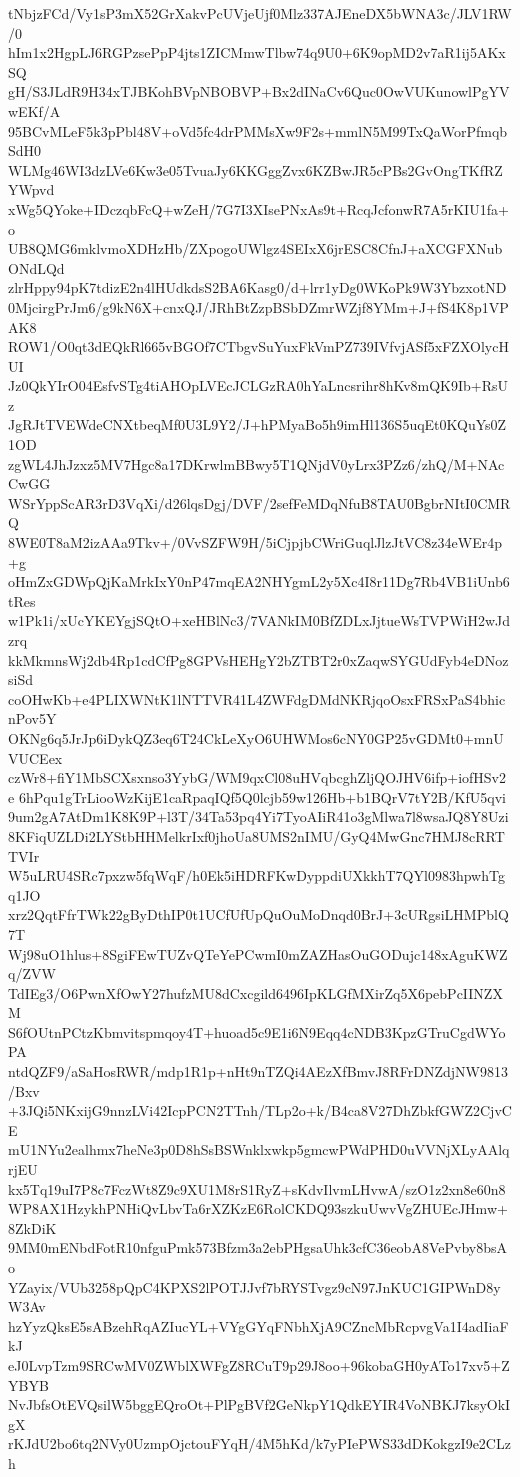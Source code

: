 tNbjzFCd/Vy1sP3mX52GrXakvPcUVjeUjf0Mlz337AJEneDX5bWNA3c/JLV1RW/0
hIm1x2HgpLJ6RGPzsePpP4jts1ZICMmwTlbw74q9U0+6K9opMD2v7aR1ij5AKxSQ
gH/S3JLdR9H34xTJBKohBVpNBOBVP+Bx2dINaCv6Quc0OwVUKunowlPgYVwEKf/A
95BCvMLeF5k3pPbl48V+oVd5fc4drPMMsXw9F2s+mmlN5M99TxQaWorPfmqbSdH0
WLMg46WI3dzLVe6Kw3e05TvuaJy6KKGggZvx6KZBwJR5cPBs2GvOngTKfRZYWpvd
xWg5QYoke+IDczqbFcQ+wZeH/7G7I3XIsePNxAs9t+RcqJcfonwR7A5rKIU1fa+o
UB8QMG6mklvmoXDHzHb/ZXpogoUWlgz4SEIxX6jrESC8CfnJ+aXCGFXNubONdLQd
zlrHppy94pK7tdizE2n4lHUdkdsS2BA6Kasg0/d+lrr1yDg0WKoPk9W3YbzxotND
0MjcirgPrJm6/g9kN6X+cnxQJ/JRhBtZzpBSbDZmrWZjf8YMm+J+fS4K8p1VPAK8
ROW1/O0qt3dEQkRl665vBGOf7CTbgvSuYuxFkVmPZ739IVfvjASf5xFZXOlycHUI
Jz0QkYIrO04EsfvSTg4tiAHOpLVEcJCLGzRA0hYaLncsrihr8hKv8mQK9Ib+RsUz
JgRJtTVEWdeCNXtbeqMf0U3L9Y2/J+hPMyaBo5h9imHl136S5uqEt0KQuYs0Z1OD
zgWL4JhJzxz5MV7Hgc8a17DKrwlmBBwy5T1QNjdV0yLrx3PZz6/zhQ/M+NAcCwGG
WSrYppScAR3rD3VqXi/d26lqsDgj/DVF/2sefFeMDqNfuB8TAU0BgbrNItI0CMRQ
8WE0T8aM2izAAa9Tkv+/0VvSZFW9H/5iCjpjbCWriGuqlJlzJtVC8z34eWEr4p+g
oHmZxGDWpQjKaMrkIxY0nP47mqEA2NHYgmL2y5Xc4I8r11Dg7Rb4VB1iUnb6tRes
w1Pk1i/xUcYKEYgjSQtO+xeHBlNc3/7VANkIM0BfZDLxJjtueWsTVPWiH2wJdzrq
kkMkmnsWj2db4Rp1cdCfPg8GPVsHEHgY2bZTBT2r0xZaqwSYGUdFyb4eDNozsiSd
coOHwKb+e4PLIXWNtK1lNTTVR41L4ZWFdgDMdNKRjqoOsxFRSxPaS4bhicnPov5Y
OKNg6q5JrJp6iDykQZ3eq6T24CkLeXyO6UHWMos6cNY0GP25vGDMt0+mnUVUCEex
czWr8+fiY1MbSCXsxnso3YybG/WM9qxCl08uHVqbcghZljQOJHV6ifp+iofHSv2e
6hPqu1gTrLiooWzKijE1caRpaqIQf5Q0lcjb59w126Hb+b1BQrV7tY2B/KfU5qvi
9um2gA7AtDm1K8K9P+l3T/34Ta53pq4Yi7TyoAIiR41o3gMlwa7l8wsaJQ8Y8Uzi
8KFiqUZLDi2LYStbHHMelkrIxf0jhoUa8UMS2nIMU/GyQ4MwGnc7HMJ8cRRTTVIr
W5uLRU4SRc7pxzw5fqWqF/h0Ek5iHDRFKwDyppdiUXkkhT7QYl0983hpwhTgq1JO
xrz2QqtFfrTWk22gByDthIP0t1UCfUfUpQuOuMoDnqd0BrJ+3cURgsiLHMPblQ7T
Wj98uO1hlus+8SgiFEwTUZvQTeYePCwmI0mZAZHasOuGODujc148xAguKWZq/ZVW
TdIEg3/O6PwnXfOwY27hufzMU8dCxcgild6496IpKLGfMXirZq5X6pebPcIINZXM
S6fOUtnPCtzKbmvitspmqoy4T+huoad5c9E1i6N9Eqq4cNDB3KpzGTruCgdWYoPA
ntdQZF9/aSaHosRWR/mdp1R1p+nHt9nTZQi4AEzXfBmvJ8RFrDNZdjNW9813/Bxv
+3JQi5NKxijG9nnzLVi42IcpPCN2TTnh/TLp2o+k/B4ca8V27DhZbkfGWZ2CjvCE
mU1NYu2ealhmx7heNe3p0D8hSsBSWnklxwkp5gmcwPWdPHD0uVVNjXLyAAlqrjEU
kx5Tq19uI7P8c7FczWt8Z9c9XU1M8rS1RyZ+sKdvIlvmLHvwA/szO1z2xn8e60n8
WP8AX1HzykhPNHiQvLbvTa6rXZKzE6RolCKDQ93szkuUwvVgZHUEcJHmw+8ZkDiK
9MM0mENbdFotR10nfguPmk573Bfzm3a2ebPHgsaUhk3cfC36eobA8VePvby8bsAo
YZayix/VUb3258pQpC4KPXS2lPOTJJvf7bRYSTvgz9cN97JnKUC1GIPWnD8yW3Av
hzYyzQksE5sABzehRqAZIucYL+VYgGYqFNbhXjA9CZncMbRcpvgVa1I4adIiaFkJ
eJ0LvpTzm9SRCwMV0ZWblXWFgZ8RCuT9p29J8oo+96kobaGH0yATo17xv5+ZYBYB
NvJbfsOtEVQsilW5bggEQroOt+PlPgBVf2GeNkpY1QdkEYIR4VoNBKJ7ksyOkIgX
rKJdU2bo6tq2NVy0UzmpOjctouFYqH/4M5hKd/k7yPIePWS33dDKokgzI9e2CLzh
